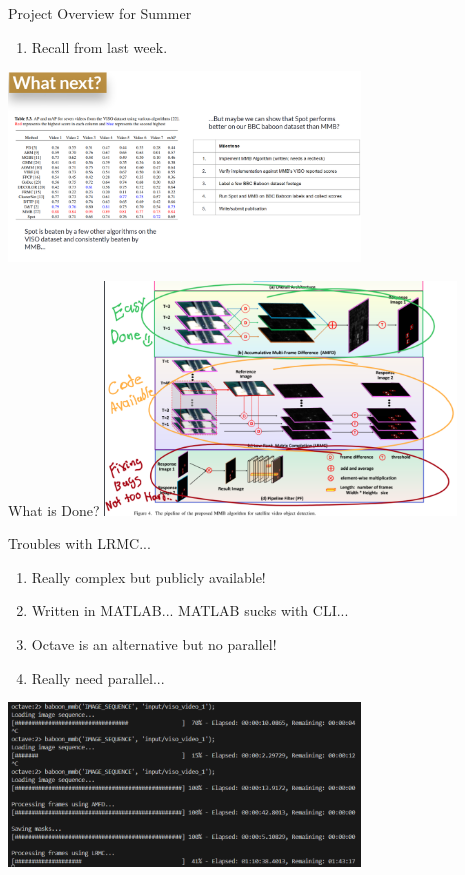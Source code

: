 \begin{frame}{Project Overview for Summer}
    \begin{enumerate}
        \item Recall from last week.
    \end{enumerate}
    \centering
    \includegraphics[height=0.7\textheight, width=0.7\textwidth, keepaspectratio]{images/bom/oldslide.png}
\end{frame}

\begin{frame}{What is Done?}
    \centering
    \includegraphics[height=0.7\textheight, width=0.7\textwidth, keepaspectratio]{images/bom/states.png}
\end{frame}

\begin{frame}{Troubles with LRMC...}
    \begin{enumerate}
        \item Really complex but publicly available!
        \item Written in MATLAB... MATLAB sucks with CLI...
        \item Octave is an alternative but no parallel!
        \item Really need parallel...
    \end{enumerate}
    \centering
    \includegraphics[height=0.7\textheight, width=0.7\textwidth, keepaspectratio]{images/bom/image.png}
\end{frame}

